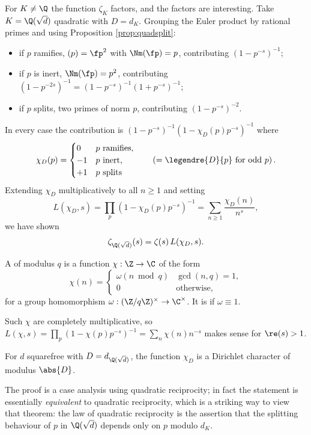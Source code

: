 For $K \neq \Q$ the function $\zeta_K$ factors, and the factors are interesting. Take $K = \Q(\sqrt d)$ quadratic with $D = d_K$. Grouping the Euler product by rational primes and using Proposition \ref{prop:quadsplit}:
\begin{itemize}
	\item if $p$ ramifies, $(p)=\fp^2$ with $\Nm(\fp) = p$, contributing $\left(1-p^{-s}\right)^{-1}$;
	\item if $p$ is inert, $\Nm(\fp)=p^2$, contributing $\left(1-p^{-2s}\right)^{-1} = \left(1-p^{-s}\right)^{-1}\left(1+p^{-s}\right)^{-1}$;
	\item if $p$ splits, two primes of norm $p$, contributing $\left(1-p^{-s}\right)^{-2}$.
\end{itemize}
In every case the contribution is $\left(1-p^{-s}\right)^{-1}\left(1-\chi_D(p)p^{-s}\right)^{-1}$ where
$$\chi_D(p) = \begin{cases}0 & p \text{ ramifies},\\ -1 & p \text{ inert},\\ +1 & p \text{ splits}\end{cases} \qquad\left( = \legendre{D}{p} \text{ for odd } p\right).$$
Extending $\chi_D$ multiplicatively to all $n \geq 1$ and setting
$$L(\chi_D,s) = \prod_p\left(1-\chi_D(p)p^{-s}\right)^{-1} = \sum_{n\ge1}\frac{\chi_D(n)}{n^s},$$
we have shown
$$\zeta_{\Q(\sqrt d)}(s) = \zeta(s)\,L(\chi_D,s).$$

\begin{definition}
	A  of modulus $q$ is a function $\chi : \Z \to \C$ of the form
	$$\chi(n) = \begin{cases}\omega(n \bmod q) & \gcd(n,q)=1,\\ 0 & \text{otherwise},\end{cases}$$
	for a group homomorphism $\omega : (\Z/q\Z)^\times \to \C^\times$. It is  if $\omega \equiv 1$.
\end{definition}

Such $\chi$ are completely multiplicative, so $L(\chi,s) = \prod_p(1-\chi(p)p^{-s})^{-1} = \sum_n\chi(n)n^{-s}$ makes sense for $\re(s)>1$.

\begin{theorem}
	For $d$ squarefree with $D = d_{\Q(\sqrt d)}$, the function $\chi_D$ is a Dirichlet character of modulus $\abs{D}$.
\end{theorem}

The proof is a case analysis using quadratic reciprocity; in fact the statement is essentially \emph{equivalent} to quadratic reciprocity, which is a striking way to view that theorem: the law of quadratic reciprocity is the assertion that the splitting behaviour of $p$ in $\Q(\sqrt d)$ depends only on $p$ modulo $d_K$.

